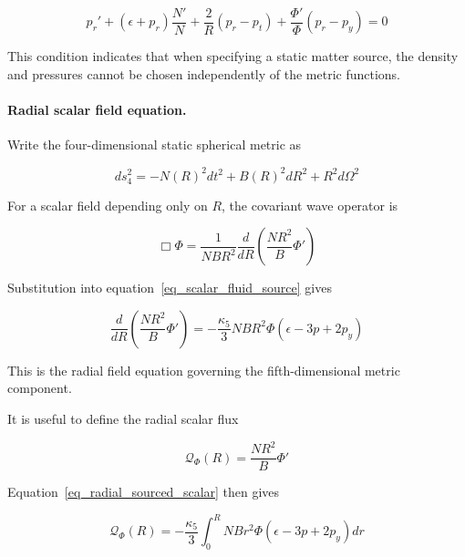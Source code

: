 \documentclass[pdflatex,sn-mathphys-num]{sn-jnl}%
\theoremstyle{thmstyleone}%
\theoremstyle{thmstyletwo}%
\theoremstyle{thmstylethree}%
\begin{document}
\begin{equation}
    p_r'
    +
    (\epsilon+p_r)\frac{N'}{N}
    +
    \frac{2}{R}(p_r-p_t)
    +
    \frac{\Phi'}{\Phi}(p_r-p_y)
    =
    0
    \label{eq_radial_stress_conservation}
\end{equation}

This condition indicates that when specifying a static matter source, the density and pressures cannot be chosen independently of the metric functions.

\paragraph{Radial scalar field equation.}

Write the four-dimensional static spherical metric as

\begin{equation}
    ds_4^2
    =
    -N(R)^2dt^2
    +
    B(R)^2dR^2
    +
    R^2d\Omega^2
    \label{eq_static_spherical_metric}
\end{equation}

For a scalar field depending only on $R$, the covariant wave operator is

\begin{equation}\label{eq_radial_scalar_operator}
    \Box\Phi
    =
    \frac{1}{NB R^2}
    \frac{d}{dR}
    \left(
        \frac{NR^2}{B}\Phi'
    \right)
\end{equation}

Substitution into equation~\eqref{eq_scalar_fluid_source} gives

\begin{equation}\label{eq_radial_sourced_scalar}
    \boxed{
    \frac{d}{dR}
    \left(
        \frac{NR^2}{B}\Phi'
    \right)
    =
    -\frac{\kappa_5}{3}
    NB R^2\Phi
    \left(
        \epsilon-3p+2p_y
    \right)
    }
\end{equation}

This is the radial field equation governing the fifth-dimensional metric component.

It is useful to define the radial scalar flux

\begin{equation}
    \mathcal Q_\Phi(R)
    =
    \frac{NR^2}{B}\Phi'
\end{equation}

Equation~\eqref{eq_radial_sourced_scalar} then gives

\begin{equation}\label{eq_scalar_flux_integral}
    \boxed{
    \mathcal Q_\Phi(R)
    =
    -\frac{\kappa_5}{3}
    \int_0^R
    NB r^2\Phi
    \left(
        \epsilon-3p+2p_y
    \right)dr
    }
\end{equation}
\end{document}

